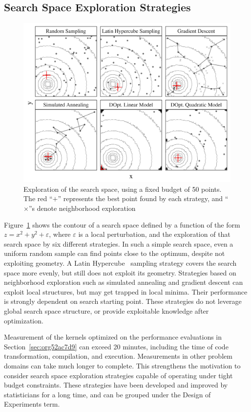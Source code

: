 \documentclass[conference]{IEEEtran}
\begin{document}
\subsection{Search Space Exploration Strategies}
\label{sec:org4b4ae2c}
\begin{figure}[htbp]
\centering
\includegraphics[width=.95\columnwidth]{./img/sampling_comparison.pdf}
\caption{\label{fig:orgc3cf1e1}
Exploration of the search space, using a fixed budget of 50 points. The red ``\(+\)'' represents the best point found by each strategy, and ``\(\times\)''s denote neighborhood exploration}
\end{figure}

Figure~\ref{fig:orgc3cf1e1} shows the contour of a search space defined
by a function of the form \(z = x^2 + y^2 + \varepsilon\), where \(\varepsilon\) is
a local perturbation, and the exploration of that search space by six different
strategies. In such a simple search space, even a uniform random sample can find
points close to the optimum, despite not exploiting geometry. A Latin
Hypercube~\cite{carnell2018lhs} sampling strategy covers the search space
more evenly, but still does not exploit its geometry. Strategies based on
neighborhood exploration such as simulated annealing and gradient descent can
exploit local structures, but may get trapped in local minima. Their
performance is strongly dependent on search starting point. These strategies do
not leverage global search space structure, or provide exploitable knowledge
after optimization.

Measurement of the kernels optimized on the performance evaluations in
Section~\ref{sec:org52ac7d9} can exceed 20 minutes, including the time
of code transformation, compilation, and execution. Measurements in other
problem domains can take much longer to complete. This strengthens the motivation
to consider search space exploration strategies capable of operating under tight
budget constraints. These strategies have been developed and improved by
statisticians for a long time, and can be grouped under the Design of
Experiments term.
\end{document}
